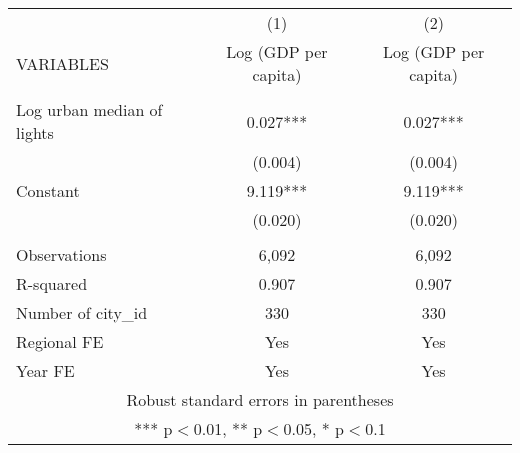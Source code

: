 \documentclass[]{article}
\begin{document}
\begin{tabular}{lcc} \hline
 & (1) & (2) \\
VARIABLES & Log (GDP per capita) & Log (GDP per capita) \\ \hline
 &  &  \\
Log urban median of lights & 0.027*** & 0.027*** \\
 & (0.004) & (0.004) \\
Constant & 9.119*** & 9.119*** \\
 & (0.020) & (0.020) \\
 &  &  \\
Observations & 6,092 & 6,092 \\
R-squared & 0.907 & 0.907 \\
Number of city\_id & 330 & 330 \\
Regional FE & Yes & Yes \\
 Year FE & Yes & Yes \\ \hline
\multicolumn{3}{c}{ Robust standard errors in parentheses} \\
\multicolumn{3}{c}{ *** p$<$0.01, ** p$<$0.05, * p$<$0.1} \\
\end{tabular}
\end{document}
